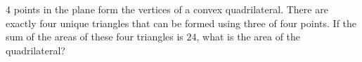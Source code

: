 $4$ points in the plane form the vertices of a convex quadrilateral. There are exactly four unique triangles that can be formed using three of four points. If the sum of the areas of these four triangles is $24$, what is the area of the quadrilateral?
